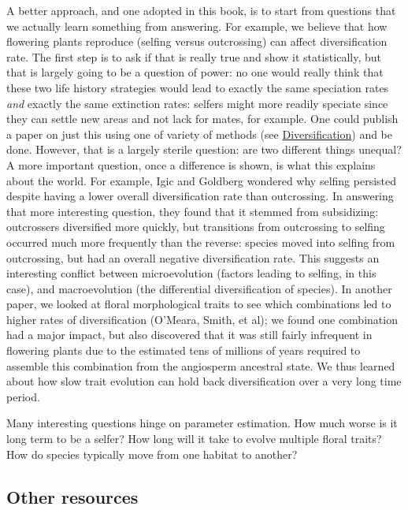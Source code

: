 \documentclass[]{book}
\theoremstyle{definition}
\theoremstyle{definition}
\theoremstyle{remark}
\begin{document}
A better approach, and one adopted in this book, is to start from
questions that we actually learn something from answering. For example,
we believe that how flowering plants reproduce (selfing versus
outcrossing) can affect diversification rate. The first step is to ask
if that is really true and show it statistically, but that is largely
going to be a question of power: no one would really think that these
two life history strategies would lead to exactly the same speciation
rates \emph{and} exactly the same extinction rates: selfers might more
readily speciate since they can settle new areas and not lack for mates,
for example. One could publish a paper on just this using one of variety
of methods (see \protect\hyperlink{diversification}{Diversification})
and be done. However, that is a largely sterile question: are two
different things unequal? A more important question, once a difference
is shown, is what this explains about the world. For example, Igic and
Goldberg wondered why selfing persisted despite having a lower overall
diversification rate than outcrossing. In answering that more
interesting question, they found that it stemmed from subsidizing:
outcrossers diversified more quickly, but transitions from outcrossing
to selfing occurred much more frequently than the reverse: species moved
into selfing from outcrossing, but had an overall negative
diversification rate. This suggests an interesting conflict between
microevolution (factors leading to selfing, in this case), and
macroevolution (the differential diversification of species). In another
paper, we looked at floral morphological traits to see which
combinations led to higher rates of diversification (O'Meara, Smith, et
al); we found one combination had a major impact, but also discovered
that it was still fairly infrequent in flowering plants due to the
estimated tens of millions of years required to assemble this
combination from the angiosperm ancestral state. We thus learned about
how slow trait evolution can hold back diversification over a very long
time period.

Many interesting questions hinge on parameter estimation. How much worse
is it long term to be a selfer? How long will it take to evolve multiple
floral traits? How do species typically move from one habitat to
another?

\subsection{Other resources}\label{other-resources}
\end{document}

